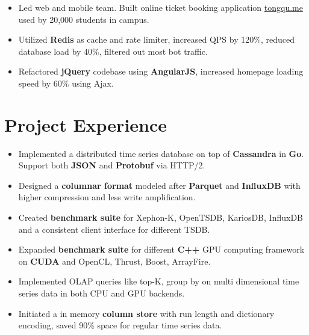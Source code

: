 \documentclass[11pt, letterpaper]{simple-cv}
\begin{document}
\begin{itemize}
  \item Led web and mobile team. Built online ticket booking application \href{https://tongqu.me}{tongqu.me} used by 20,000 students in campus.
  \item Utilized \textbf{Redis} as cache and rate limiter, increased QPS by 120\%, reduced database load by 40\%, filtered out most bot traffic.
  \item Refactored \textbf{jQuery} codebase using \textbf{AngularJS}, increased homepage loading speed by 60\% using Ajax.
\end{itemize}

\section{Project Experience}



\begin{itemize}
  \item Implemented a distributed time series database on top of \textbf{Cassandra} in \textbf{Go}. Support both \textbf{JSON} and \textbf{Protobuf} via HTTP/2.
  \item Designed a \textbf{columnar format} modeled after \textbf{Parquet} and \textbf{InfluxDB} with higher compression and less write amplification.
  \item Created \textbf{benchmark suite} for Xephon-K, OpenTSDB, KariosDB, InfluxDB and a consistent client interface for different TSDB.
\end{itemize}


\begin{itemize}
  \item Expanded \textbf{benchmark suite} for different \textbf{C++} GPU computing framework on \textbf{CUDA} and OpenCL, Thrust, Boost, ArrayFire.
  \item Implemented OLAP queries like top-K, group by on multi dimensional time series data in both CPU and GPU backends.
  \item Initiated a in memory \textbf{column store} with run length and dictionary encoding, saved 90\% space for regular time series data.
\end{itemize}
\end{document}
